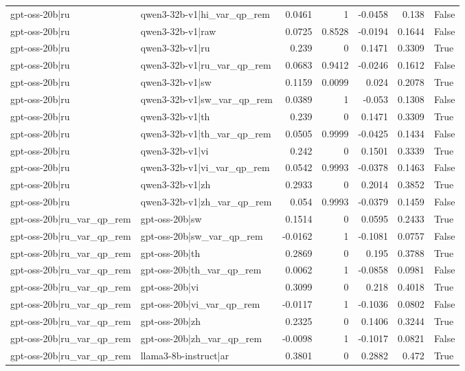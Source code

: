 \begin{table}
\begin{tabular}{l l r r r r l}
gpt-oss-20b|ru & qwen3-32b-v1|hi_var_qp_rem & 0.0461 & 1 & -0.0458 & 0.138 & False \\
gpt-oss-20b|ru & qwen3-32b-v1|raw & 0.0725 & 0.8528 & -0.0194 & 0.1644 & False \\
gpt-oss-20b|ru & qwen3-32b-v1|ru & 0.239 & 0 & 0.1471 & 0.3309 & True \\
gpt-oss-20b|ru & qwen3-32b-v1|ru_var_qp_rem & 0.0683 & 0.9412 & -0.0246 & 0.1612 & False \\
gpt-oss-20b|ru & qwen3-32b-v1|sw & 0.1159 & 0.0099 & 0.024 & 0.2078 & True \\
gpt-oss-20b|ru & qwen3-32b-v1|sw_var_qp_rem & 0.0389 & 1 & -0.053 & 0.1308 & False \\
gpt-oss-20b|ru & qwen3-32b-v1|th & 0.239 & 0 & 0.1471 & 0.3309 & True \\
gpt-oss-20b|ru & qwen3-32b-v1|th_var_qp_rem & 0.0505 & 0.9999 & -0.0425 & 0.1434 & False \\
gpt-oss-20b|ru & qwen3-32b-v1|vi & 0.242 & 0 & 0.1501 & 0.3339 & True \\
gpt-oss-20b|ru & qwen3-32b-v1|vi_var_qp_rem & 0.0542 & 0.9993 & -0.0378 & 0.1463 & False \\
gpt-oss-20b|ru & qwen3-32b-v1|zh & 0.2933 & 0 & 0.2014 & 0.3852 & True \\
gpt-oss-20b|ru & qwen3-32b-v1|zh_var_qp_rem & 0.054 & 0.9993 & -0.0379 & 0.1459 & False \\
gpt-oss-20b|ru_var_qp_rem & gpt-oss-20b|sw & 0.1514 & 0 & 0.0595 & 0.2433 & True \\
gpt-oss-20b|ru_var_qp_rem & gpt-oss-20b|sw_var_qp_rem & -0.0162 & 1 & -0.1081 & 0.0757 & False \\
gpt-oss-20b|ru_var_qp_rem & gpt-oss-20b|th & 0.2869 & 0 & 0.195 & 0.3788 & True \\
gpt-oss-20b|ru_var_qp_rem & gpt-oss-20b|th_var_qp_rem & 0.0062 & 1 & -0.0858 & 0.0981 & False \\
gpt-oss-20b|ru_var_qp_rem & gpt-oss-20b|vi & 0.3099 & 0 & 0.218 & 0.4018 & True \\
gpt-oss-20b|ru_var_qp_rem & gpt-oss-20b|vi_var_qp_rem & -0.0117 & 1 & -0.1036 & 0.0802 & False \\
gpt-oss-20b|ru_var_qp_rem & gpt-oss-20b|zh & 0.2325 & 0 & 0.1406 & 0.3244 & True \\
gpt-oss-20b|ru_var_qp_rem & gpt-oss-20b|zh_var_qp_rem & -0.0098 & 1 & -0.1017 & 0.0821 & False \\
gpt-oss-20b|ru_var_qp_rem & llama3-8b-instruct|ar & 0.3801 & 0 & 0.2882 & 0.472 & True \\

\end{tabular}
\end{table}
